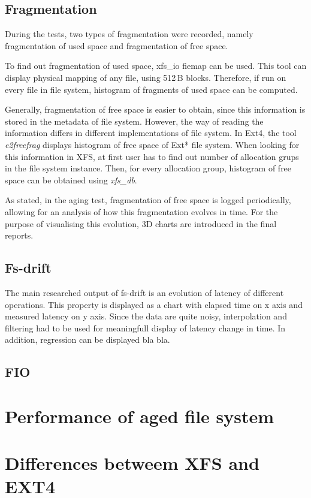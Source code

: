 \documentclass[
  color, %
  table, %
  lof,   %
  lot,   %
]{fithesis3}
\begin{document}
\subsection{Fragmentation}
During the tests, two types of fragmentation were recorded, namely fragmentation of used space and fragmentation of free space.

To find out fragmentation of used space, xfs\_io fiemap can be used. This tool can display physical mapping of any file, using 512\,B blocks. Therefore, if run on every file in file system, histogram of fragments of used space can be computed.

Generally, fragmentation of free space is easier to obtain, since this information is stored in the metadata of file system. However, the way of reading the information differs in different implementations of file system. In Ext4, the tool \textit{e2freefrag} displays histogram of free space of Ext* file system. When looking for this information in XFS, at first user has to find out number of allocation grups in the file system instance. Then, for every allocation group, histogram of free space can be obtained using \textit{xfs\_db}.

As stated, in the aging test, fragmentation of free space is logged periodically, allowing for an analysis of how this fragmentation evolves in time. For the purpose of visualising this evolution, 3D charts are introduced in the final reports.

\subsection{Fs-drift}
The main researched output of fs-drift is an evolution of latency of different operations. This property is displayed as a chart with elapsed time on x axis and measured latency on y axis. Since the data are quite noisy, interpolation and filtering had to be used for meaningfull display of latency change in time. In addition, regression can be displayed bla bla.

\subsection{FIO}
\section{Performance of aged file system}
\section{Differences betweem XFS and EXT4}
\end{document}
